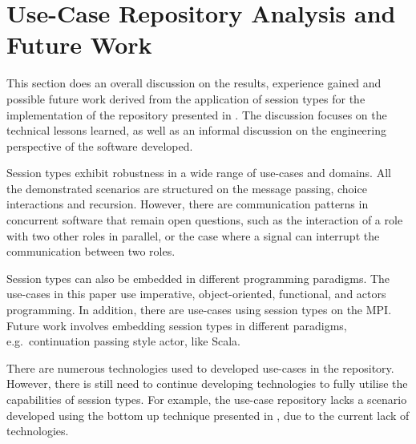 \section{Use-Case Repository Analysis and Future Work}
\label{sec:session_engineeering}


This section does an overall discussion on the
results, experience gained and possible future work
derived from the application
of session types for the implementation of the
repository presented in .
The discussion focuses on the technical lessons
learned, as well as an informal discussion
on the engineering perspective of the software
developed.


Session types exhibit robustness in a wide range of
use-cases and domains. All the demonstrated scenarios
are structured on the message passing,
choice interactions and recursion. 
However, there are communication patterns 
in concurrent software that remain open
questions, such as the interaction of a role with two
other roles in parallel, or the case where a signal
can interrupt the communication between two roles.

Session types can also be embedded in different
programming paradigms. The use-cases in this paper
use imperative, object-oriented, functional, and
actors programming.
In addition, there are use-cases
using session types on the MPI.
Future work involves embedding session types
in different paradigms, e.g.~continuation passing
style actor, like Scala.

There are numerous technologies used to developed use-cases
in the repository. However, there is still need to continue
developing technologies to fully utilise the capabilities
of session types.
For example, the use-case repository lacks a
scenario developed using the bottom up technique
presented in , due to
the current lack of technologies.


%	
%	

